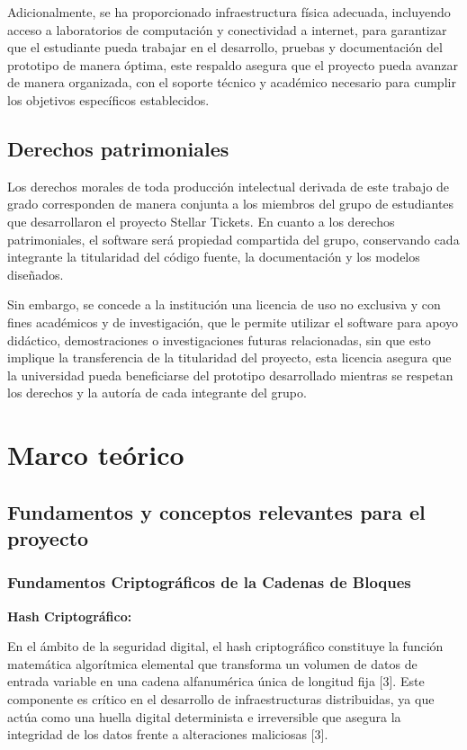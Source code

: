 \documentclass[12pt,a4paper]{article}
\begin{document}
Adicionalmente, se ha proporcionado infraestructura física adecuada, incluyendo acceso a laboratorios de computación y conectividad a internet, para garantizar que el estudiante pueda trabajar en el desarrollo, pruebas y documentación del prototipo de manera óptima, este respaldo asegura que el proyecto pueda avanzar de manera organizada, con el soporte técnico y académico necesario para cumplir los objetivos específicos establecidos.

\subsection{Derechos patrimoniales}
Los derechos morales de toda producción intelectual derivada de este trabajo de grado corresponden de manera conjunta a los miembros del grupo de estudiantes que desarrollaron el proyecto Stellar Tickets. En cuanto a los derechos patrimoniales, el software será propiedad compartida del grupo, conservando cada integrante la titularidad del código fuente, la documentación y los modelos diseñados. 

Sin embargo, se concede a la institución una licencia de uso no exclusiva y con fines académicos y de investigación, que le permite utilizar el software para apoyo didáctico, demostraciones o investigaciones futuras relacionadas, sin que esto implique la transferencia de la titularidad del proyecto, esta licencia asegura que la universidad pueda beneficiarse del prototipo desarrollado mientras se respetan los derechos y la autoría de cada integrante del grupo.

\section{Marco teórico}

\subsection{Fundamentos y conceptos relevantes para el proyecto}
\subsubsection{Fundamentos Criptográficos de la Cadenas de Bloques}

\textbf{Hash Criptográfico:}

En el ámbito de la seguridad digital, el hash criptográfico constituye la función matemática algorítmica elemental que transforma un volumen de datos de entrada variable en una cadena alfanumérica única de longitud fija [3]. Este componente es crítico en el desarrollo de infraestructuras distribuidas, ya que actúa como una huella digital determinista e irreversible que asegura la integridad de los datos frente a alteraciones maliciosas [3].
\end{document}
